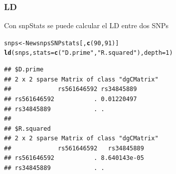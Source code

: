 \documentclass{beamer}\usepackage[]{graphicx}\usepackage[]{color}
\makeatletter
\newcommand{\hlnum}[1]{\textcolor[rgb]{0.686,0.059,0.569}{#1}}%
\newcommand{\hlstr}[1]{\textcolor[rgb]{0.192,0.494,0.8}{#1}}%
\newcommand{\hlopt}[1]{\textcolor[rgb]{0,0,0}{#1}}%
\newcommand{\hlstd}[1]{\textcolor[rgb]{0.345,0.345,0.345}{#1}}%
\newcommand{\hlkwb}[1]{\textcolor[rgb]{0.69,0.353,0.396}{#1}}%
\newcommand{\hlkwc}[1]{\textcolor[rgb]{0.333,0.667,0.333}{#1}}%
\newcommand{\hlkwd}[1]{\textcolor[rgb]{0.737,0.353,0.396}{\textbf{#1}}}%
\newenvironment{kframe}{%
 \def\at@end@of@kframe{}%
 \ifinner\ifhmode%
  \def\at@end@of@kframe{\end{minipage}}%
  \begin{minipage}{\columnwidth}%
 \fi\fi%
 \def\FrameCommand##1{\hskip\@totalleftmargin \hskip-\fboxsep
 \colorbox{shadecolor}{##1}\hskip-\fboxsep
     \hskip-\linewidth \hskip-\@totalleftmargin \hskip\columnwidth}%
 \MakeFramed {\advance\hsize-\width
   \@totalleftmargin\z@ \linewidth\hsize
   \@setminipage}}%
 {\par\unskip\endMakeFramed%
 \at@end@of@kframe}
\newenvironment{knitrout}{}{} %
\makeatother
\begin{document}
\begin{frame}[fragile]
\frametitle{LD}
Con snpStats se puede calcular el LD entre dos SNPs
\begin{knitrout}\footnotesize
{}\color{fgcolor}\begin{kframe}
\begin{alltt}
\hlstd{snps} \hlkwb{<-} \hlstd{NewsnpsSNPstats[,}\hlkwd{c}\hlstd{(}\hlnum{90}\hlstd{,}\hlnum{91}\hlstd{)]}
\hlkwd{ld}\hlstd{(snps,} \hlkwc{stats}\hlstd{=}\hlkwd{c}\hlstd{(}\hlstr{"D.prime"}\hlstd{,} \hlstr{"R.squared"}\hlstd{),}\hlkwc{depth}\hlstd{=}\hlnum{1}\hlstd{)}
\end{alltt}
\begin{verbatim}
## $D.prime
## 2 x 2 sparse Matrix of class "dgCMatrix"
##             rs561646592 rs34845889
## rs561646592           . 0.01220497
## rs34845889            . .         
## 
## $R.squared
## 2 x 2 sparse Matrix of class "dgCMatrix"
##             rs561646592   rs34845889
## rs561646592           . 8.640143e-05
## rs34845889            . .
\end{verbatim}
\end{kframe}
\end{knitrout}
\end{frame}

\end{document}
